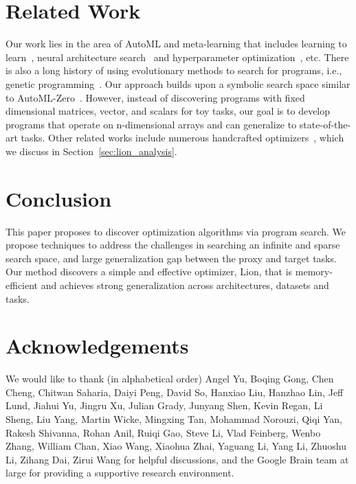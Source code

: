 \documentclass{article}
\newcommand{\name}{Lion}
\begin{document}
\section{Related Work}
Our work lies in the area of AutoML and meta-learning that includes learning to learn~\citep{andrychowicz2016l2l, ravi2017optfewshot, wichrowska2017optscale, bello2017nos, xiong2022graphlr, metz2019understandl2l, metz2022velo}, neural architecture search~\citep{real2019regularized, zoph2017nas, pham2018enas, liu2018darts, chen2020sdarts, wang2021rethinking, so2019evolved, chen2021drnas, yang2022tabnas, wang2021nosh} and hyperparameter optimization~\citep{li2017hyperband, jamison2016hpo, hutter2011smac, dong2021autohas}, etc. There is also a long history of using evolutionary methods to search for programs, i.e., genetic programming~\citep{koza1994genetic,brameier2007linear,holland1992adaptation}. 
Our approach builds upon a symbolic search space similar to AutoML-Zero~\citep{real2020automl, peng2020pyglove}.
However, instead of discovering programs with fixed dimensional matrices, vector, and scalars for toy tasks,
our goal is to develop programs that operate on n-dimensional arrays and can generalize to state-of-the-art tasks.  Other related works include numerous handcrafted optimizers~\citep{kingma2014adam, bernstein2018signsgd, duchi2011adagrad, shazeer2018adafactor, zhuang2020adabelief, dozat2016nadam, anil2020second, liu2020radam, reddi2018amsgrad, gupta2018shampoo, riedmiller1993rprop, ma2018quasihyperbolic}, which we discuss in Section~\ref{sec:lion_analysis}.





\section{Conclusion}
This paper proposes to discover optimization algorithms via program search. We propose techniques to address the challenges in searching an infinite and sparse search space, and large generalization gap between the proxy and target tasks. Our method discovers a simple and effective optimizer, \name{}, that is memory-efficient and achieves strong generalization across architectures, datasets and tasks.


\section*{Acknowledgements}
We would like to thank (in alphabetical order) Angel Yu, Boqing Gong, Chen Cheng, Chitwan Saharia, Daiyi Peng, David So, Hanxiao Liu, Hanzhao Lin, Jeff Lund, Jiahui Yu, Jingru Xu, Julian Grady, Junyang Shen, Kevin Regan, Li Sheng, Liu Yang, Martin Wicke, Mingxing Tan, Mohammad Norouzi, Qiqi Yan, Rakesh Shivanna, Rohan Anil, Ruiqi Gao, Steve Li, Vlad Feinberg, Wenbo Zhang, William Chan, Xiao Wang, Xiaohua Zhai, Yaguang Li, Yang Li, Zhuoshu Li, Zihang Dai, Zirui Wang for helpful discussions, and the Google Brain team at large for providing a supportive research environment.
\end{document}
